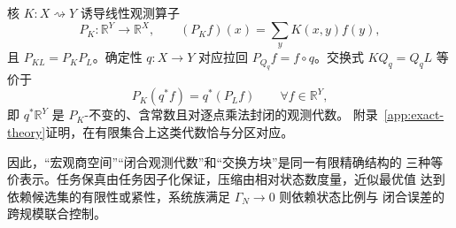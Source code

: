 核 $K:X\rightsquigarrow Y$ 诱导线性观测算子
\[
P_K:\mathbb R^Y\to\mathbb R^X,
\qquad
(P_Kf)(x)=\sum_yK(x,y)f(y),
\]
且 $P_{KL}=P_KP_L$。确定性 $q:X\to Y$ 对应拉回
$P_{Q_q}f=f\circ q$。交换式 $KQ_q=Q_qL$ 等价于
\[
P_K(q^*f)=q^*(P_Lf)
\qquad\forall f\in\mathbb R^Y,
\]
即 $q^*\mathbb R^Y$ 是 $P_K$-不变的、含常数且对逐点乘法封闭的观测代数。
附录~\ref{app:exact-theory}证明，在有限集合上这类代数恰与分区对应。

因此，“宏观商空间”“闭合观测代数”和“交换方块”是同一有限精确结构的
三种等价表示。任务保真由任务因子化保证，压缩由相对状态数度量，近似最优值
达到依赖候选集的有限性或紧性，系统族满足 $\Gamma_N\to0$ 则依赖状态比例与
闭合误差的跨规模联合控制。
